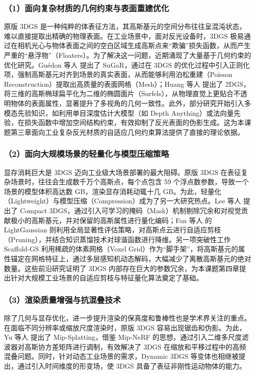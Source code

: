\subsubsection{（1）面向复杂材质的几何约束与表面重建优化}
原版 3DGS 是一种纯粹的体表征方法，其高斯基元的空间分布往往呈混沌状态，难以直接提取出精确的物理表面。在工业场景中，面对反光设备时，3DGS 极易通过在相机光心与物体表面之间的空白区域生成高斯点来“欺骗”损失函数，从而产生严重的“悬浮物”（Floaters）。为了解决这一问题，近期涌现了大量基于几何约束的优化研究。Guédon 等人\cite{guedon2024sugar} 提出了 SuGaR，通过在 3DGS 的优化过程中引入正则化项，强制高斯基元对齐到场景的真实表面，从而能够利用泊松重建（Poisson Reconstruction）提取出高质量的表面网格（Mesh）；Huang 等人\cite{huang20242dgs} 提出了 2DGS，将三维的高斯椭球扁平化为二维的椭圆面片（Surfels），从物理直觉上更贴合不透明物体的表面属性，显著提升了多视角的几何一致性。此外，部分研究开始引入多模态先验知识，如利用单目深度估计大模型（如 Depth Anything\cite{yang2024depthanything}）或法向量先验，在损失函数中增加空间结构约束，有效抑制了反光表面的伪影生成。这为本课题第三章面向工业复杂反光材质的自适应几何约束算法提供了直接的理论依据。

\subsubsection{（2）面向大规模场景的轻量化与模型压缩策略}
显存消耗巨大是 3DGS 迈向工业级大场景部署的最大阻碍。原版 3DGS 在表征复杂场景时，往往会生成数千万个高斯点，每个点包含 59 个浮点数参数，导致一个场景的模型体积高达数 GB，渲染显存消耗动辄十几 GB。为此，轻量化（Lightweight）与模型压缩（Compression）成为了另一大研究热点。Lee 等人\cite{lee2024compact3dgs} 提出了 Compact 3DGS，通过引入可学习的掩码（Mask）机制剔除冗余和对视觉贡献极小的高斯基元，并对保留的高斯属性进行量化编码；Fan 等人\cite{fan2024lightgaussian} 的 LightGaussian 则利用全局显著性评估策略，对高斯点云进行自适应剪枝（Pruning），并结合知识蒸馏技术对球谐函数进行降维。另一项突破性工作 Scaffold-GS\cite{lu2024scaffoldgs} 利用稀疏的体素网格（Voxel Grid）作为“脚手架”，将高斯基元的属性锚定在网格特征上，通过多层感知机动态解码，大幅减少了离散高斯基元的绝对数量。这些前沿研究证明了 3DGS 内部存在巨大的参数冗余，为本课题第四章提出针对大规模工业场景的自适应剪枝与特征量化算法奠定了基础。

\subsubsection{（3）渲染质量增强与抗混叠技术}
除了几何与显存优化，进一步提升渲染的保真度和鲁棒性也是学术界关注的重点。在面临不同分辨率或缩放尺度渲染时，原版 3DGS 容易出现锯齿和伪影。为此，Yu 等人\cite{yu2024mipsplatting} 提出了 Mip-Splatting，借鉴 Mip-NeRF 的思想，通过引入二维多尺度滤波器对高斯协方差矩阵进行调制，有效解决了 3DGS 在缩放和平移过程中的高频混叠问题。同时，针对动态工业场景的需求，Dynamic 3DGS 等变体也相继被提出，通过引入时间维度的形变场，使 3DGS 具备了表征非刚性运动物体的能力。

